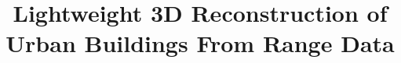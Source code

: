 \documentclass{llncs}
\begin{document}
\pagestyle{empty}

\mainmatter

\title{Lightweight 3D Reconstruction of Urban Buildings From Range Data}


%

\author{}





\maketitle
\end{document}
